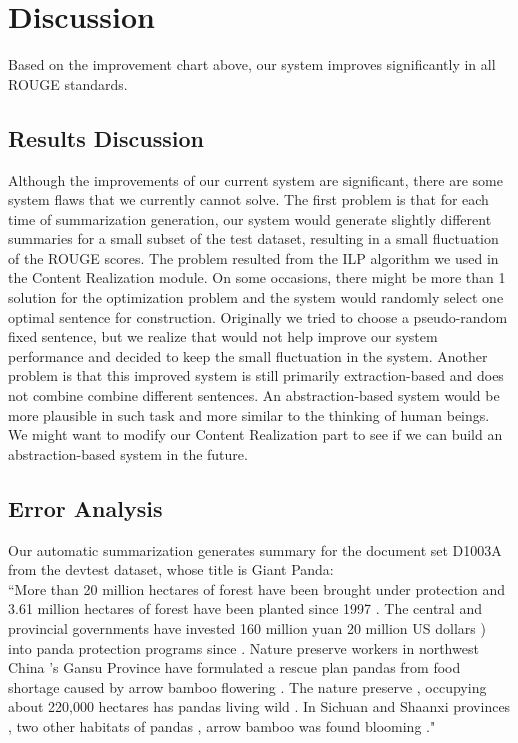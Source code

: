 \documentclass[11pt]{article}
\begin{document}
\section{Discussion}
Based on the improvement chart above, our system improves significantly in all ROUGE standards. 
\subsection{Results Discussion}
Although the improvements of our current system are significant, there are some system flaws that we currently cannot solve. The first problem is that for each time of summarization generation, our system would generate slightly different summaries for a small subset of the test dataset, resulting in a small fluctuation of the ROUGE scores. The problem resulted from the ILP algorithm we used in the Content Realization module. On some occasions, there might be more than 1 solution for the optimization problem and the system would randomly select one optimal sentence for construction. Originally we tried to choose a pseudo-random fixed sentence, but we realize that would not help improve our system performance and decided to keep the small fluctuation in the system.
\indent
Another problem is that this improved system is still primarily extraction-based and does not combine combine different sentences. An abstraction-based system would be more plausible in such task and more similar to the thinking of human beings. We might want to modify our Content Realization part to see if we can build an abstraction-based system in the future.
\subsection{Error Analysis}
Our automatic summarization generates summary for the document set D1003A from the devtest dataset, whose title is Giant Panda:\\
``More than 20 million hectares of forest have been brought under protection and 3.61 million hectares of forest have been planted since 1997 .
The central and provincial governments have invested 160 million yuan 20 million US dollars ) into panda protection programs since .
Nature preserve workers in northwest China 's Gansu Province have formulated a rescue plan pandas from food shortage caused by arrow bamboo flowering .
The nature preserve , occupying about 220,000 hectares has pandas living wild .
In Sichuan and Shaanxi provinces , two other habitats of pandas , arrow bamboo was found blooming ."\\
\end{document}
